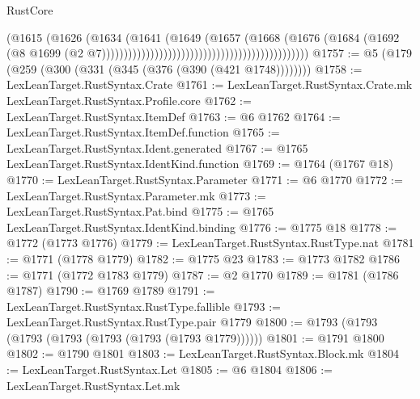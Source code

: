 \begin{lexlean}{RustCore}
\begin{coremodule}
                                                                          (@1615
                                                                            (@1626
                                                                              (@1634
                                                                                (@1641
                                                                                  (@1649
                                                                                    (@1657
                                                                                      (@1668
                                                                                        (@1676
                                                                                          (@1684
                                                                                            (@1692
                                                                                              (@8
                                                                                                @1699
                                                                                                (@2
                                                                                                  @7)))))))))))))))))))))))))))))))))))))))))))))))
@1757 := @5 (@179 (@259 (@300 (@331 (@345 (@376 (@390 (@421 @1748))))))))
@1758 := LexLeanTarget.RustSyntax.Crate
@1761 := LexLeanTarget.RustSyntax.Crate.mk LexLeanTarget.RustSyntax.Profile.core
@1762 := LexLeanTarget.RustSyntax.ItemDef
@1763 := @6 @1762
@1764 := LexLeanTarget.RustSyntax.ItemDef.function
@1765 := LexLeanTarget.RustSyntax.Ident.generated
@1767 := @1765 LexLeanTarget.RustSyntax.IdentKind.function
@1769 := @1764 (@1767 @18)
@1770 := LexLeanTarget.RustSyntax.Parameter
@1771 := @6 @1770
@1772 := LexLeanTarget.RustSyntax.Parameter.mk
@1773 := LexLeanTarget.RustSyntax.Pat.bind
@1775 := @1765 LexLeanTarget.RustSyntax.IdentKind.binding
@1776 := @1775 @18
@1778 := @1772 (@1773 @1776)
@1779 := LexLeanTarget.RustSyntax.RustType.nat
@1781 := @1771 (@1778 @1779)
@1782 := @1775 @23
@1783 := @1773 @1782
@1786 := @1771 (@1772 @1783 @1779)
@1787 := @2 @1770
@1789 := @1781 (@1786 @1787)
@1790 := @1769 @1789
@1791 := LexLeanTarget.RustSyntax.RustType.fallible
@1793 := LexLeanTarget.RustSyntax.RustType.pair @1779
@1800 := @1793 (@1793 (@1793 (@1793 (@1793 (@1793 (@1793 @1779))))))
@1801 := @1791 @1800
@1802 := @1790 @1801
@1803 := LexLeanTarget.RustSyntax.Block.mk
@1804 := LexLeanTarget.RustSyntax.Let
@1805 := @6 @1804
@1806 := LexLeanTarget.RustSyntax.Let.mk

\end{coremodule}
\end{lexlean}
